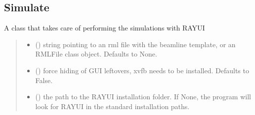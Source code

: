 \documentclass[letterpaper,10pt,english]{sphinxmanual}
\begin{document}
\subsection{Simulate}
\label{\detokenize{code_documentation:simulate}}

\begin{fulllineitems}
\label{\detokenize{code_documentation:raypyng.simulate.Simulate}}
\pysigstartsignatures
{}
\pysigstopsignatures
\sphinxAtStartPar
A class that takes care of performing the simulations with RAY\sphinxhyphen{}UI
\begin{quote}\begin{description}
\begin{itemize}
\item {} 
\sphinxAtStartPar
{} (\sphinxstyleliteralemphasis{\sphinxupquote{, }}) \textendash{} string pointing to an rml file with
the beamline template, or an RMLFile
class object. Defaults to None.

\item {} 
\sphinxAtStartPar
{} (\sphinxstyleliteralemphasis{\sphinxupquote{, }}) \textendash{} force hiding of GUI leftovers, xvfb needs
to be installed. Defaults to False.

\item {} 
\sphinxAtStartPar
{} (\sphinxstyleliteralemphasis{\sphinxupquote{, }}) \textendash{} the path to the RAY\sphinxhyphen{}UI installation folder.
If None, the program will look for RAY\sphinxhyphen{}UI in
the standard installation paths.

\end{itemize}


\end{description}
\end{quote}
\end{fulllineitems}
\end{document}
